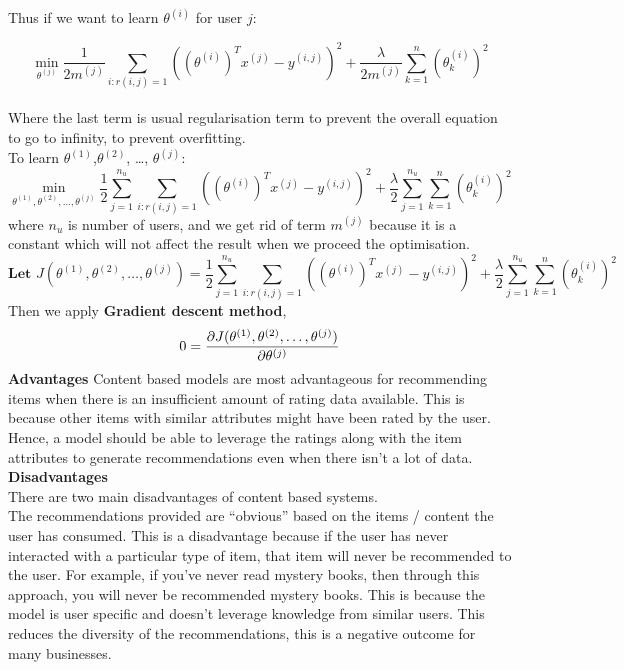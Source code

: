 Thus if we want to learn $\theta^{(i)}$ for user $j$:

\begin{equation*}
\min_{\theta^{(j)}} \frac{1}{2m^{(j)}}\sum_{i:r(i,j) = 1}\left((\theta^{(i)})^{T}x^{(j)}-y^{(i,j)}\right)^{2} + \frac{\lambda}{2m^{(j)}}\sum_{k = 1}^{n}(\theta^{(i)}_{k})^{2}
\end{equation*}
\\Where the last term is usual regularisation term to prevent the overall equation to go to infinity, to prevent overfitting.
\\ To learn $\theta^{(1)}$,$\theta^{(2)}$, \dots, $\theta^{(j)}$:
\begin{equation*}
\min_{\theta^{(1)},\theta^{(2)}, \dots, \theta^{(j)}} \frac{1}{2}\sum_{j = 1}^{n_{u}}\sum_{i:r(i,j) = 1}\left((\theta^{(i)})^{T}x^{(j)}-y^{(i,j)}\right)^{2} + \frac{\lambda}{2}\sum_{j = 1}^{n_{u}}\sum_{k = 1}^{n}(\theta^{(i)}_{k})^{2}
\end{equation*}
where $n_{u}$ is number of users, and we get rid of term $m^{(j)}$ because it is a constant which will not affect the result when we proceed the optimisation.
\begin{equation*}
\textbf{Let     } J(\theta^{(1)},\theta^{(2)}, \dots, \theta^{(j)}) = \frac{1}{2}\sum_{j = 1}^{n_{u}}\sum_{i:r(i,j) = 1}\left((\theta^{(i)})^{T}x^{(j)}-y^{(i,j)}\right)^{2} + \frac{\lambda}{2}\sum_{j = 1}^{n_{u}}\sum_{k = 1}^{n}(\theta^{(i)}_{k})^{2}
\end{equation*}
Then we apply \textbf{Gradient descent method}, 
\begin{equation*}
\\ 0 = \frac{\partial{J(\theta^{(1)},\theta^{(2)}, \dots, \theta^{(j)})}} {\partial{\theta^{(j)}}}
\end{equation*}
\textbf{Advantages}
Content based models are most advantageous for recommending items when there is an insufficient amount of rating data available. This is because other items with similar attributes might have been rated by the user. Hence, a model should be able to leverage the ratings along with the item attributes to generate recommendations even when there isn’t a lot of data.
\\\textbf{Disadvantages}
\\There are two main disadvantages of content based systems.
\\The recommendations provided are “obvious” based on the items / content the user has consumed. This is a disadvantage because if the user has never interacted with a particular type of item, that item will never be recommended to the user. For example, if you’ve never read mystery books, then through this approach, you will never be recommended mystery books. This is because the model is user specific and doesn’t leverage knowledge from similar users. This reduces the diversity of the recommendations, this is a negative outcome for many businesses.
